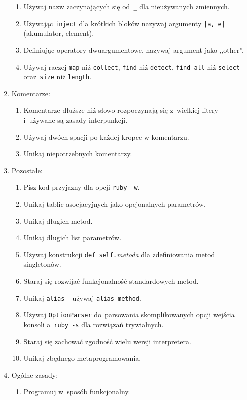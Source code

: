 \begin{enumerate}
\begin{enumerate}
    \item Używaj nazw zaczynających się od~\texttt{\_} dla nieużywanych zmiennych.
    \item Używając \texttt{inject} dla krótkich bloków nazywaj argumenty \texttt{|a, e|} (akumulator, element).
    \item Definiując operatory dwuargumentowe, nazywaj argument jako ,,other''.
    \item Używaj raczej \texttt{map} niż \texttt{collect}, \texttt{find} niż \texttt{detect}, \texttt{find\_all} niż \texttt{select} oraz~\texttt{size} niż \texttt{length}.
  \end{enumerate}
  \item Komentarze:
  \begin{enumerate}
    \item Komentarze dłuższe niż słowo rozpoczynają się z~wielkiej litery i~używane są zasady interpunkcji.
    \item Używaj dwóch spacji po każdej kropce w komentarzu.
    \item Unikaj niepotrzebnych komentarzy.
  \end{enumerate}
  \item Pozostałe:
  \begin{enumerate}
    \item Pisz kod przyjazny dla opcji \texttt{ruby -w}.
    \item Unikaj tablic asocjacyjnych jako opcjonalnych parametrów.
    \item Unikaj długich metod.
    \item Unikaj długich list parametrów.
    \item Używaj konstrukcji \texttt{def self.}\textit{metoda} dla zdefiniowania metod singletonów.
    \item Staraj się rozwijać funkcjonalność standardowych metod.
    \item Unikaj \texttt{alias} -- używaj \texttt{alias\_method}.
    \item Używaj \texttt{OptionParser} do~parsowania skomplikowanych opcji wejścia konsoli a~\texttt{ruby -s} dla rozwiązań trywialnych.
    \item Staraj się zachować zgodność wielu wersji interpretera.
    \item Unikaj zbędnego metaprogramowania.
  \end{enumerate}
  \item Ogólne zasady:
  \begin{enumerate}
    \item Programuj w~sposób funkcjonalny.

\end{enumerate}
\end{enumerate}
